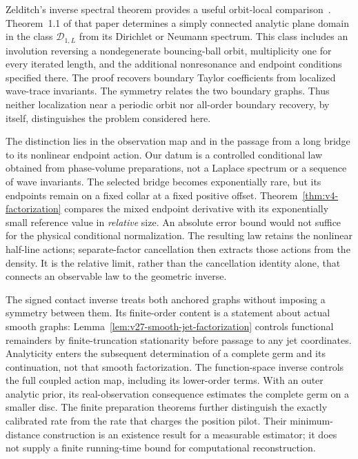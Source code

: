 Zelditch's inverse spectral theorem provides a useful orbit-local
comparison~\cite{Zelditch2009}.  Theorem~1.1 of that paper determines a
simply connected analytic plane domain in the class $\mathcal D_{1,L}$
from its Dirichlet or Neumann spectrum.  This class includes an involution
reversing a nondegenerate bouncing-ball orbit, multiplicity one for every
iterated length, and the additional nonresonance and endpoint conditions
specified there.  The proof recovers boundary Taylor coefficients from
localized wave-trace invariants.  The symmetry relates the two boundary
graphs.  Thus neither localization near a periodic orbit nor all-order
boundary recovery, by itself, distinguishes the problem considered here.

The distinction lies in the observation map and in the passage from a
long bridge to its nonlinear endpoint action.  Our datum is a controlled
conditional law obtained from phase-volume preparations, not a Laplace
spectrum or a sequence of wave invariants.  The selected bridge becomes
exponentially rare, but its endpoints remain on a fixed collar at a fixed
positive offset.  Theorem~\ref{thm:v4-factorization} compares the mixed
endpoint derivative with its exponentially small reference value in
\emph{relative} size.  An absolute error bound would not suffice for the
physical conditional normalization.  The resulting law retains the
nonlinear half-line actions; separate-factor cancellation then extracts
those actions from the density.  It is the relative limit, rather than
the cancellation identity alone, that connects an observable law to the
geometric inverse.

The signed contact inverse treats both anchored graphs without imposing
a symmetry between them.  Its finite-order content is a statement about
actual smooth graphs: Lemma~\ref{lem:v27-smooth-jet-factorization} controls
functional remainders by finite-truncation stationarity before passage to
any jet coordinates.  Analyticity enters the subsequent determination of
a complete germ and its continuation, not that smooth factorization.
The function-space inverse controls the full coupled action map, including
its lower-order terms.  With an outer analytic prior, its real-observation
consequence estimates the complete germ on a smaller disc.  The finite
preparation theorems further distinguish the exactly calibrated rate from
the rate that charges the position pilot.  Their minimum-distance
construction is an existence result for a measurable estimator; it does
not supply a finite running-time bound for computational reconstruction.

